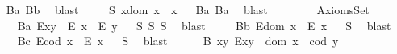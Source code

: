 \begin{isabellebody}
\isadelimproof
\ %
\endisadelimproof
%
\isatagproof
{}\isamarkupfalse%
\ B{}a\ B{}b\ \isamarkupfalse%
\ blast%
\endisatagproof
{\isafoldproof}%
%
\isadelimproof
%
\endisadelimproof
\isanewline
\ \ \ \isamarkupfalse%
\ S{}{\isacharcolon}\ {\isachardoublequoteopen}x{\isasymcdot}{\isacharparenleft}dom\ x{\isacharparenright}\ {\isasymcong}\ x{\isachardoublequoteclose}%
\isadelimproof
\ %
\endisadelimproof
%
\isatagproof
{}\isamarkupfalse%
\ B{}a\ B{}a\ \isamarkupfalse%
\ blast%
\endisatagproof
{\isafoldproof}%
%
\isadelimproof
%
\endisadelimproof
\ \ \isanewline
\ \ \isamarkupfalse%
%
\isamarkuptrue%
\ \isamarkupfalse%
\ AxiomsSet{}\isanewline
\ \ \isanewline
\ \ \ \isamarkupfalse%
\ B{}a{\isacharcolon}\ {\isachardoublequoteopen}E{\isacharparenleft}x{\isasymcdot}y{\isacharparenright}\ \isactrlbold {\isasymrightarrow}\ {\isacharparenleft}E\ x\ \isactrlbold {\isasymand}\ E\ y{\isacharparenright}{\isachardoublequoteclose}%
\isadelimproof
\ %
\endisadelimproof
%
\isatagproof
{}\isamarkupfalse%
\ S{}\ S{}\ S{}\ \isamarkupfalse%
\ blast%
\endisatagproof
{\isafoldproof}%
%
\isadelimproof
%
\endisadelimproof
\isanewline
\ \ \ \isamarkupfalse%
\ B{}b{\isacharcolon}\ {\isachardoublequoteopen}E{\isacharparenleft}dom\ x{\isacharparenright}\ \isactrlbold {\isasymrightarrow}\ E\ x{\isachardoublequoteclose}%
\isadelimproof
\ %
\endisadelimproof
%
\isatagproof
{}\isamarkupfalse%
\ S{}\ \isamarkupfalse%
\ blast%
\endisatagproof
{\isafoldproof}%
%
\isadelimproof
%
\endisadelimproof
\isanewline
\ \ \ \isamarkupfalse%
\ B{}c{\isacharcolon}\ {\isachardoublequoteopen}E{\isacharparenleft}cod\ x{\isacharparenright}\ \isactrlbold {\isasymrightarrow}\ E\ x{\isachardoublequoteclose}%
\isadelimproof
\ %
\endisadelimproof
%
\isatagproof
{}\isamarkupfalse%
\ S{}\ \isamarkupfalse%
\ blast%
\endisatagproof
{\isafoldproof}%
%
\isadelimproof
%
\endisadelimproof
\isanewline
\ \ \ \isamarkupfalse%
\ \ B{}{\isacharcolon}\ {\isachardoublequoteopen}\isactrlbold {\isasymforall}x{\isachardot}\isactrlbold {\isasymforall}y{\isachardot}\ E{\isacharparenleft}x{\isasymcdot}y{\isacharparenright}\ \isactrlbold {\isasymleftrightarrow}\ dom\ x\ {\isasymcong}\ cod\ y{\isachardoublequoteclose}%

\end{isabellebody}
